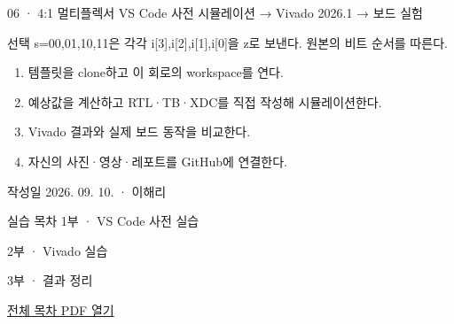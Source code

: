 
\renewcommand{\labonehome}{\hyperlink{modern-06-contents}{\contentsbutton}}
\renewcommand{\legacySource}[1]{}
\providecommand{\terminalbox}[1]{\par\vspace{0.15cm}{\setlength{\fboxsep}{7pt}\colorbox{black}{\parbox{\dimexpr\textwidth-14pt\relax}{\color{white}\ttfamily\fontsize{7}{9}\selectfont #1}}}\par\vspace{0.15cm}}

\begingroup
\renewcommand{\small}{\fontsize{9}{11}\selectfont}
\begin{frame}{06 · 4:1 멀티플렉서}\relax
\small
VS Code 사전 시뮬레이션 → Vivado 2026.1 → 보드 실험\par\vspace{0.22cm}선택 s=00,01,10,11은 각각 i[3],i[2],i[1],i[0]을 z로 보낸다. 원본의 비트 순서를 따른다.\par\begin{enumerate}\setlength{\itemsep}{0.22cm}
\item 템플릿을 clone하고 이 회로의 workspace를 연다.
\item 예상값을 계산하고 RTL·TB·XDC를 직접 작성해 시뮬레이션한다.
\item Vivado 결과와 실제 보드 동작을 비교한다.
\item 자신의 사진·영상·레포트를 GitHub에 연결한다.
\end{enumerate}
작성일 2026. 09. 10. · 이해리\par
\end{frame}

\begin{frame}[label=modern-06-contents]{실습 목차}\relax
\small
1부 · VS Code 사전 실습\par{}\par\vspace{0.2cm}
\par\vspace{0.4cm}
2부 · Vivado 실습\par{}\par\vspace{0.4cm}
3부 · 결과 정리\par{}\par\vspace{0.35cm}
\href{04.LAB1_00_CONTENTS.pdf}{전체 목차 PDF 열기}
\end{frame}

